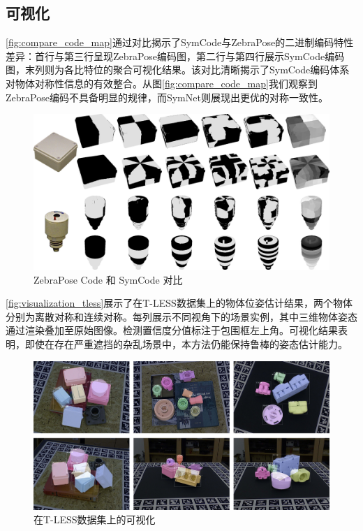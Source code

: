 \subsection{可视化} 

\autoref{fig:compare_code_map}通过对比揭示了SymCode与ZebraPose的二进制编码特性差异：首行与第三行呈现ZebraPose编码图，第二行与第四行展示SymCode编码图，末列则为各比特位的聚合可视化结果。该对比清晰揭示了SymCode编码体系对物体对称性信息的有效整合。从图\autoref{fig:compare_code_map}我们观察到ZebraPose编码不具备明显的规律，而SymNet则展现出更优的对称一致性。

\begin{figure}[htbp]
        \centerline{\includegraphics[width=1.0\textwidth]{figure/symnet/compare_code_map.jpg}}
        \caption{ZebraPose Code 和 SymCode 对比}
        \label{fig:compare_code_map}
\end{figure}

\autoref{fig:visualization_tless}展示了在T-LESS数据集上的物体位姿估计结果，两个物体分别为离散对称和连续对称。每列展示不同视角下的场景实例，其中三维物体姿态通过渲染叠加至原始图像。检测置信度分值标注于包围框左上角。可视化结果表明，即使在存在严重遮挡的杂乱场景中，本方法仍能保持鲁棒的姿态估计能力。

\begin{figure}[htbp]
        \centerline{\includegraphics[width=1.0\textwidth]{figure/symnet/visualization_tless.jpg}}
        \caption{在T-LESS数据集上的可视化}
        \label{fig:visualization_tless}
\end{figure}

